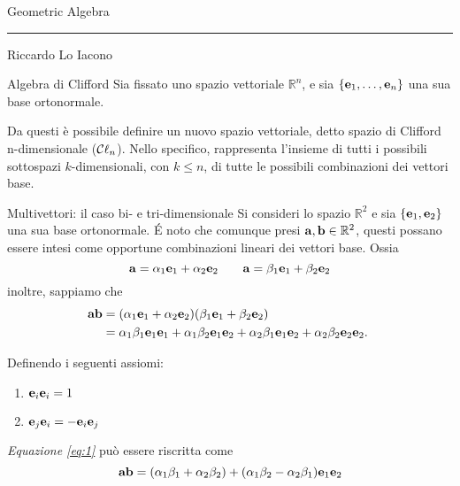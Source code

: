 \begin{frame}
    \Huge Geometric Algebra
    \rule{\textwidth}{.25pt}
    \small{Riccardo Lo Iacono}
\end{frame}
\begin{frame}{Algebra di Clifford}
    Sia fissato uno spazio vettoriale \(\mathbb{R}^{n}\), e sia 
    \(\{\mathbf{e}_{1}, \ldots, \mathbf{e}_{n}\}\) una sua base ortonormale.

    Da questi è possibile definire un nuovo spazio vettoriale,
    detto spazio di Clifford n-dimensionale (\(\Clifford\)).
    Nello specifico, \Clifford rappresenta l'insieme di tutti i 
    possibili sottospazi \(k\)-dimensionali, con \(k \le n\), 
    di tutte le possibili combinazioni dei vettori base.
\end{frame}
\begin{frame}{Multivettori: il caso bi- e tri-dimensionale}
    Si consideri lo spazio \(\mathbb{R}^{2}\) e sia \(\{\mathbf{e}_{1}, 
    \mathbf{e}_{2}\}\) una sua base ortonormale. 
    \'E noto che comunque presi \(\mathbf{a}, \mathbf{b} \in \mathbb{R}^{2}\),
    questi possano essere intesi come opportune combinazioni lineari dei vettori 
    base. Ossia
    \[
        \mathbf{a} = \alpha_{1}\mathbf{e}_{1} + \alpha_{2}\mathbf{e}_{2} 
        \qquad \mathbf{a} = \beta_{1}\mathbf{e}_{1} + \beta_{2}\mathbf{e}_{2}
    \]
    inoltre, sappiamo che 
    \begin{equation}\label{eq:1}
        \begin{aligned}
        \mathbf{ab} & = 
            (\alpha_{1}\mathbf{e}_{1} + \alpha_{2}\mathbf{e}_{2})
            (\beta_{1}\mathbf{e}_{1} + \beta_{2}\mathbf{e}_{2}) \\
            & = \alpha_{1}\beta_{1}\mathbf{e}_{1}\mathbf{e}_{1} +
                \alpha_{1}\beta_{2}\mathbf{e}_{1}\mathbf{e}_{2} +
                \alpha_{2}\beta_{1}\mathbf{e}_{1}\mathbf{e}_{2} + 
                \alpha_{2}\beta_{2}\mathbf{e}_{2}\mathbf{e}_{2}.
        \end{aligned}\
    \end{equation}
\end{frame}
\begin{frame}
    Definendo i seguenti assiomi:
    \begin{enumerate}
        \item \(\mathbf{e}_{i}\mathbf{e}_{i} = 1\)
        \item \(\mathbf{e}_{j}\mathbf{e}_{i} = - \mathbf{e}_{i}\mathbf{e}_{j}\)
    \end{enumerate}
    \emph{Equazione \eqref{eq:1}} può essere riscritta come 
    \begin{equation}\label{eq:2}
        \mathbf{ab} = (\alpha_{1}\beta_{1} + \alpha_{2}\beta_{2}) + 
            (\alpha_{1}\beta_{2} - \alpha_{2}\beta_{1})\mathbf{e}_{1}\mathbf{e}_{2}
    \end{equation}
\end{frame}
